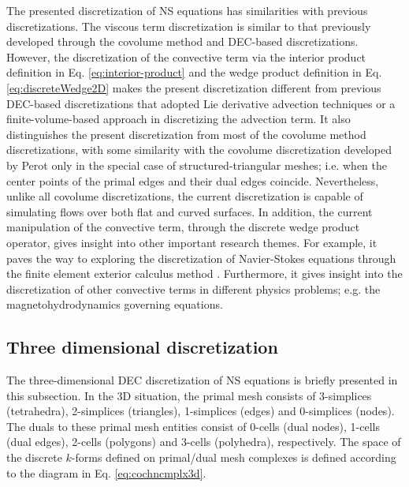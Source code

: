 \documentclass[final,12pt,times]{elsarticle}
\begin{document}
The presented discretization of NS equations has similarities with previous discretizations.
The viscous term discretization is similar to that previously developed through the covolume method \cite{HallCavendish:1991dvmsvf,cavendish1992solution,choudhury1990discretization,nicolaides1993covolume,perot2000conservation} and DEC-based \cite{elcott2007stable,mullen2009energy} discretizations. However, the discretization of the convective term via the interior product definition in Eq. \eqref{eq:interior-product} and the wedge product definition in Eq. \eqref{eq:discreteWedge2D} makes the present discretization different from previous DEC-based discretizations that adopted Lie derivative advection techniques \cite{elcott2007stable} or a finite-volume-based approach \cite{mullen2009energy} in discretizing the advection term. It also distinguishes the present discretization from most of the covolume method discretizations, with some similarity with the covolume discretization developed by Perot \cite{perot2000conservation} only in the special case of structured-triangular meshes; i.e. when the center points of the primal edges and their dual edges coincide. Nevertheless, unlike all covolume discretizations, the current discretization is capable of simulating flows over both flat and curved surfaces. In addition, the current manipulation of the convective term, through the discrete wedge product operator, gives insight into other important research themes. For example, it paves the way to exploring the discretization of Navier-Stokes equations through the finite element exterior calculus method \cite{arnold2010finite,arnold2006finite}. Furthermore, it gives insight into the discretization of other convective terms in different physics problems; e.g. the magnetohydrodynamics governing equations.

\subsection{Three dimensional discretization}
\label{subsec:discretization:3D}

The three-dimensional DEC discretization of NS equations is briefly presented in this subsection. In the 3D situation, the primal mesh consists of 3-simplices (tetrahedra), 2-simplices (triangles), 1-simplices (edges) and 0-simplices (nodes). The duals to these primal mesh entities consist of 0-cells (dual nodes), 1-cells (dual edges), 2-cells (polygons) and 3-cells (polyhedra), respectively. The space of the discrete $k$-forms defined on primal/dual mesh complexes is defined according to the diagram in Eq. \eqref{eq:cochncmplx3d}.  
\end{document}
